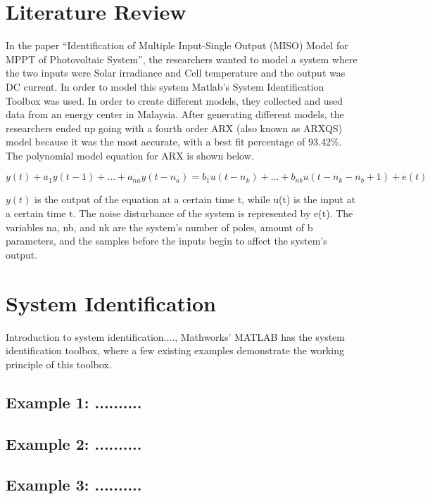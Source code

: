 \documentclass[letterpaper,12pt]{article}   %
\begin{document}
 \section{Literature Review}
In the paper “Identification of Multiple Input-Single Output (MISO) Model for MPPT of Photovoltaic System”, the researchers wanted to model a system where the two inputs were Solar irradiance and Cell temperature and the output was DC current. In order to model this system Matlab’s System Identification Toolbox was used. In order to create different models, they collected and used data from an energy center in Malaysia. After generating different models, the researchers ended up going with a fourth order ARX (also known as ARXQS) model because it was the most accurate, with a best fit percentage of 93.42\%. The polynomial model equation for ARX is shown below. 

$y(t) + a_1y(t - 1) +...+a_{na}y(t - n_{a}) = b_{1}u(t-n_{k})+...+b_{nb}u(t - n_{k}-n_{b}+1) + e(t)$

$y(t)$ is the output of the equation at a certain time t, while u(t) is the input at a certain time t. The noise disturbance of the system is represented by e(t). The variables na, nb, and nk are the system’s number of poles, amount of b parameters, and the samples before the inputs begin to affect the system’s output.



\section{System Identification}

Introduction to system identification...., Mathworks' MATLAB has the system
identification toolbox, where a few existing examples demonstrate the working principle of this toolbox.

\subsection{Example 1: ..........}
\label{sec:sysID-Example1}



\subsection{Example 2: ..........}
\label{sec:sysID-Example2}



\subsection{Example 3: ..........}
\label{sec:sysID-Example3}
\end{document}

